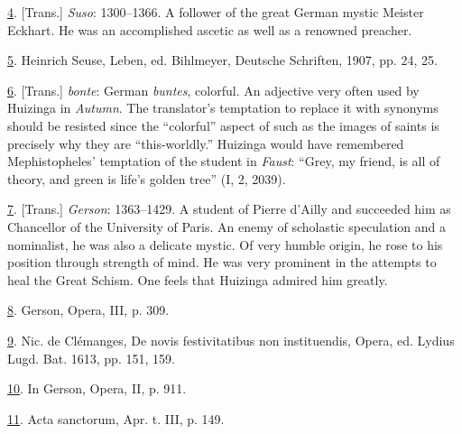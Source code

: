 \protect\hypertarget{23_NOTES.xhtmlux5cux23id_1264}{\protect\hyperlink{13_Chapter_Six__THE_DEPICTION_OF_TH.xhtmlux5cux23id_1263}{4}}.
{[}Trans.{]} \emph{Suso}: 1300--1366. A follower of the great German
mystic Meister Eckhart. He was an accomplished ascetic as well as a
renowned preacher.

\protect\hypertarget{23_NOTES.xhtmlux5cux23id_1262}{\protect\hyperlink{13_Chapter_Six__THE_DEPICTION_OF_TH.xhtmlux5cux23id_1261}{5}}.
Heinrich Seuse, Leben, ed. Bihlmeyer, Deutsche Schriften, 1907, pp. 24,
25.

\protect\hypertarget{23_NOTES.xhtmlux5cux23id_1260}{\protect\hyperlink{13_Chapter_Six__THE_DEPICTION_OF_TH.xhtmlux5cux23id_1259}{6}}.
{[}Trans.{]} \emph{bonte}: German \emph{buntes}, colorful. An adjective
very often used by Huizinga in \emph{Autumn}. The translator's
temptation to replace it with synonyms should be resisted since the
``colorful'' aspect of such as the images of saints is precisely why
they are ``this-worldly.'' Huizinga would have remembered
Mephistopheles' temptation of the student in \emph{Faust}: ``Grey, my
friend, is all of theory, and green is life's golden tree'' (I, 2,
2039).

\protect\hypertarget{23_NOTES.xhtmlux5cux23id_1258}{\protect\hyperlink{13_Chapter_Six__THE_DEPICTION_OF_TH.xhtmlux5cux23id_1257}{7}}.
{[}Trans.{]} \emph{Gerson}: 1363--1429. A student of Pierre d'Ailly and
succeeded him as Chancellor of the University of Paris. An enemy of
scholastic speculation and a nominalist, he was also a delicate mystic.
Of very humble origin, he rose to his position through strength of mind.
He was very prominent in the attempts to heal the Great Schism. One
feels that Huizinga admired him greatly.

\protect\hypertarget{23_NOTES.xhtmlux5cux23id_1256}{\protect\hyperlink{13_Chapter_Six__THE_DEPICTION_OF_TH.xhtmlux5cux23id_1255}{8}}.
Gerson, Opera, III, p. 309.

\protect\hypertarget{23_NOTES.xhtmlux5cux23id_1254}{\protect\hyperlink{13_Chapter_Six__THE_DEPICTION_OF_TH.xhtmlux5cux23id_1253}{9}}.
Nic. de Clémanges, De novis festivitatibus non instituendis, Opera, ed.
Lydius Lugd. Bat. 1613, pp. 151, 159.

\protect\hypertarget{23_NOTES.xhtmlux5cux23id_1252}{\protect\hyperlink{13_Chapter_Six__THE_DEPICTION_OF_TH.xhtmlux5cux23id_1251}{10}}.
In Gerson, Opera, II, p. 911.

\protect\hypertarget{23_NOTES.xhtmlux5cux23id_1250}{\protect\hyperlink{13_Chapter_Six__THE_DEPICTION_OF_TH.xhtmlux5cux23id_1249}{11}}.
Acta sanctorum, Apr. t. III, p. 149.

